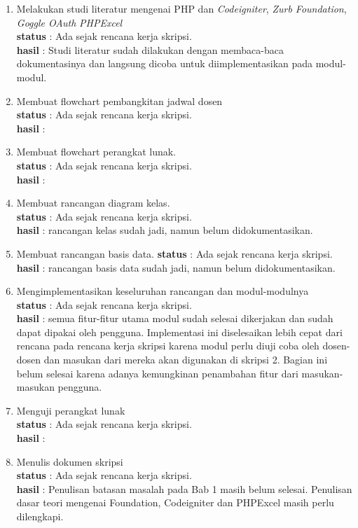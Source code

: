 \documentclass[a4paper,twoside]{article}
\begin{document}
	\begin{enumerate}
		\item Melakukan studi literatur mengenai PHP dan \textit{Codeigniter}, \textit{Zurb Foundation}, \textit{Goggle OAuth} \textit{PHPExcel}\\
		      \textbf{status} : Ada sejak rencana kerja skripsi.\\
		      \textbf{hasil} : Studi literatur sudah dilakukan dengan membaca-baca dokumentasinya dan langsung dicoba untuk diimplementasikan pada modul-modul.
		
		\item Membuat flowchart pembangkitan jadwal dosen \\
		    \textbf{status} : Ada sejak rencana kerja skripsi.\\
		    \textbf{hasil} : 
		\item Membuat flowchart perangkat lunak. \\
		    \textbf{status} : Ada sejak rencana kerja skripsi.\\
		    \textbf{hasil} :
		\item Membuat rancangan diagram kelas. \\
		    \textbf{status} : Ada sejak rencana kerja skripsi.\\
		    \textbf{hasil} : rancangan kelas sudah jadi, namun belum didokumentasikan.
		\item Membuat rancangan basis data.
		    \textbf{status} : Ada sejak rencana kerja skripsi.\\
		    \textbf{hasil} : rancangan basis data sudah jadi, namun belum didokumentasikan.
		\item Mengimplementasikan keseluruhan rancangan dan modul-modulnya \\
		    \textbf{status} : Ada sejak rencana kerja skripsi.\\
		    \textbf{hasil} : semua fitur-fitur utama modul sudah selesai dikerjakan dan sudah dapat dipakai oleh pengguna. Implementasi ini diselesaikan lebih cepat dari rencana pada rencana kerja skripsi karena modul perlu diuji coba oleh dosen-dosen dan masukan dari mereka akan digunakan di skripsi 2. Bagian ini belum selesai karena adanya kemungkinan penambahan fitur dari masukan-masukan pengguna.
		\item Menguji perangkat lunak \\
		    \textbf{status} : Ada sejak rencana kerja skripsi.\\
		    \textbf{hasil} : 
		\item Menulis dokumen skripsi \\
		    \textbf{status} : Ada sejak rencana kerja skripsi.\\
		    \textbf{hasil} : Penulisan batasan masalah pada Bab 1 masih belum selesai. Penulisan dasar teori mengenai Foundation, Codeigniter dan PHPExcel masih perlu dilengkapi.
	\end{enumerate}
\end{document}
